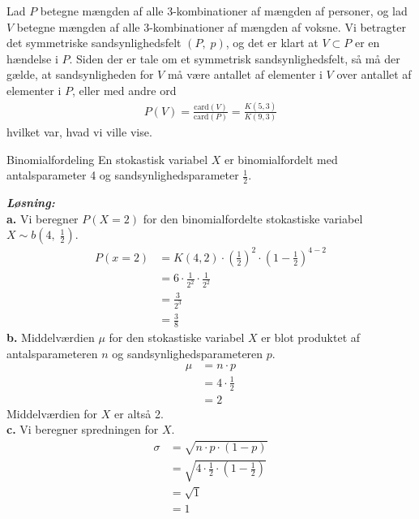 \documentclass{article}
\newcommand{\sol}{\setlength{\parindent}{0cm}\textbf{\textit{Løsning:}}\setlength{\parindent}{1cm}}
\newcommand{\card}{\text{card}}
\begin{document}
Lad $P$ betegne mængden af alle 3-kombinationer af mængden af personer, og lad $V$ betegne mængden af alle 3-kombinationer af mængden af voksne.
Vi betragter det symmetriske sandsynlighedsfelt $(P,\;p)$, og det er klart at $V \subset P$ er en hændelse i $P$. 
Siden der er tale om et symmetrisk sandsynlighedsfelt, så må der gælde, at sandsynligheden for $V$ må være antallet af elementer i $V$ over antallet af elementer i $P$, eller med andre ord
\begin{equation*}
\begin{split}
  P(V)=\frac{\card(V)}{\card(P)} =\frac{K(5,3)}{K(9,3)}
\end{split}
\end{equation*}
hvilket var, hvad vi ville vise.
\begin{question}{Binomialfordeling}{}
  En stokastisk variabel $X$ er binomialfordelt med antalsparameter 4 og sandsynlighedsparameter $\frac{1}{2}$.
\end{question}
\sol \\
\textbf{a.}
Vi beregner $P(X=2)$ for den binomialfordelte stokastiske variabel $X \sim b(4,\;\frac{1}{2})$. 
\begin{equation*}
\begin{split}
  P(x=2)&=K(4,2) \cdot \left(\frac{1}{2}\right) ^{2} \cdot \left(1-\frac{1}{2}\right) ^{4-2}\\
  &=6 \cdot \frac{1}{2^2} \cdot \frac{1}{2^2}\\
  &=\frac{3}{2^3}\\
  &=\frac{3}{8}
\end{split}
\end{equation*}
\textbf{b.}
Middelværdien $\mu $ for den stokastiske variabel $X$ er blot produktet af antalsparameteren $n$ og sandsynlighedsparameteren $p$.
\begin{equation*}
\begin{split}
  \mu &= n \cdot p \\
  &=4 \cdot \frac{1}{2} \\
  &=2
\end{split}
\end{equation*}
Middelværdien for $X$ er altså 2.\\[1ex]
\textbf{c.}
Vi beregner spredningen for $X$.
\begin{equation*}
\begin{split}
  \sigma &= \sqrt{n \cdot p \cdot \left(1-p\right) }\\
  &=\sqrt{4 \cdot \frac{1}{2} \cdot \left(1- \frac{1}{2}\right) } \\
  &=\sqrt{1} \\
  &=1
\end{split}
\end{equation*}
\end{document}

